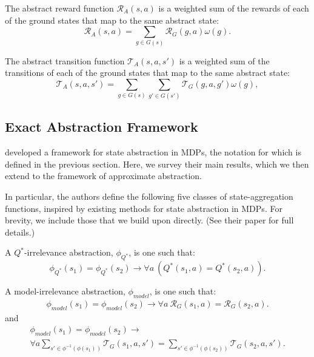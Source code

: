 The abstract reward function $\mathcal{R}_A(s,a)$ is a weighted sum of the rewards of each of the ground states that map to the same abstract state:
\begin{equation}
\mathcal{R}_A(s,a) = \sum_{g \in G(s)} \mathcal{R}_G(g,a) \omega(g) .
\end{equation}
\edefn

The abstract transition function $\mathcal{T}_A(s,a,s')$ is a weighted sum of the transitions of each of the ground states that map to the same abstract state:
\begin{equation}
\mathcal{T}_A(s,a,s') = \sum_{g \in G(s)} \sum_{g' \in G(s')} \mathcal{T}_G(g,a,g') \omega(g),
\end{equation}
\edefn




\subsection{Exact Abstraction Framework}

\citeauthor*{li2006towards} developed a framework for state abstraction in \acp{MDP}, the notation for which is defined in the previous section. Here, we survey their main results, which we then extend to the framework of approximate abstraction.

In particular, the authors define the following five classes of state-aggregation functions, inspired by existing methods for state abstraction in \acp{MDP}. For brevity, we include those that we build upon directly. (See their paper for full details.)

A $Q^*$-irrelevance abstraction, $\phi_{Q^*}$, is one such that:
\begin{equation}
\phi_{Q^*}(s_1) = \phi_{Q^*}(s_2) \rightarrow \forall a\ \left(Q^*(s_1,a) = Q^*(s_2,a)\right).
\end{equation}
\edefn

A model-irrelevance abstraction, $\phi_{model}$, is one such that:
\begin{multline}
\phi_{model}(s_1) = \phi_{model}(s_2) \rightarrow \forall a\ \mathcal{R}_G(s_1,a) = \mathcal{R}_G(s_2,a).
\end{multline}
and
\begin{multline}
\phi_{model}(s_1) = \phi_{model}(s_2) \rightarrow \\ \forall a \sum_{s' \in \phi^{-1}(\phi(s_1))} \mathcal{T}_G(s_1,a,s') = \sum_{s' \in \phi^{-1}(\phi(s_2))} \mathcal{T}_G(s_2,a,s').
\end{multline}
\edefn

